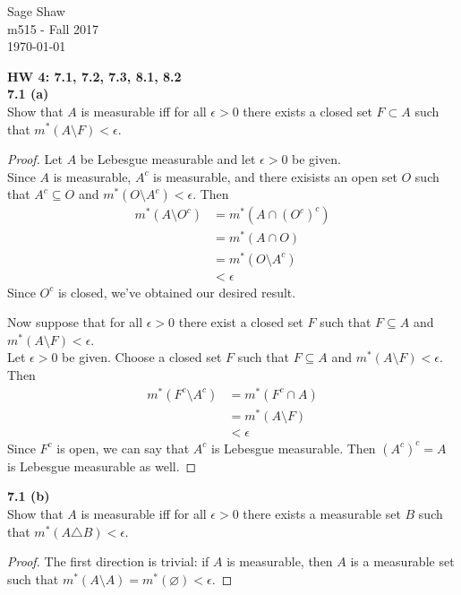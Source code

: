 \documentclass[12pt]{article}
\newcommand{\problem}[1]{\hspace{-4 ex} \large \textbf{#1}\\}
\let\emptyset\varnothing
\begin{document}
	\thispagestyle{empty}
	
	\begin{flushright}
		Sage Shaw \\
		m515 - Fall 2017 \\
		\today
	\end{flushright}
	
\large{\textbf{HW 4: 7.1, 7.2, 7.3, 8.1, 8.2}}\\

\problem{7.1 (a)} Show that $A$ is measurable iff for all $\epsilon>0$ there exists a closed set $F\subset A$ such that $m^*(A\setminus F)<\epsilon$.

	\begin{proof}
		Let $A$ be Lebesgue measurable and let $\epsilon > 0$ be given. \\
		Since $A$ is measurable, $A^c$ is measurable, and there exisists an open set $O$ such that $A^c \subseteq O$ and $m^*(O \setminus A^c) < \epsilon$. Then 
		\begin{align*}
			m^*(A \setminus O^c) & = m^*(A \cap (O^c)^c) \\
			& = m^*(A \cap O) \\
			& = m^*(O \setminus A^c) \\
			& < \epsilon
		\end{align*}
		Since $O^c$ is closed, we've obtained our desired result. \bigbreak
		
		Now suppose that for all $\epsilon > 0$ there exist a closed set $F$ such that $F \subseteq A$ and $m^*(A \setminus F) < \epsilon$. \\
		Let $\epsilon >0$ be given. Choose a closed set $F$ such that $F \subseteq A$ and $m^*(A \setminus F) < \epsilon$. Then
		\begin{align*}
			m^*(F^c \setminus A^c) & = m^*(F^c \cap A) \\
			& = m^*(A \setminus F) \\
			& < \epsilon
		\end{align*}
		Since $F^c$ is open, we can say that $A^c$ is Lebesgue measurable. Then $(A^c)^c = A$ is Lebesgue measurable as well.		
	\end{proof}

\problem{7.1 (b)} Show that $A$ is measurable iff for all $\epsilon>0$ there exists a measurable set $B$ such that $m^*(A\triangle B)<\epsilon$.

	\begin{proof}
		The first direction is trivial: if $A$ is measurable, then $A$ is a measurable set such that $m^*(A \setminus A) = m^*(\emptyset) < \epsilon$.
	\end{proof}
\end{document}
